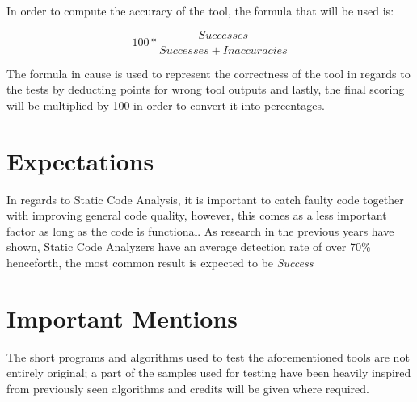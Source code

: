 
\begin{center}
    \noindent In order to compute the accuracy of the tool, the formula that will be used is:
\end{center}

\begin{equation}
100 * \frac{Successes}{Successes + Inaccuracies}    
\end{equation}\newline

\noindent The formula in cause is used to represent the correctness of the tool in regards to the tests by deducting points for wrong tool outputs and lastly, the final scoring will be multiplied by 100 in order to convert it into percentages.

\section{Expectations}

In regards to Static Code Analysis, it is important to catch faulty code together with improving general code quality, however, this comes as a less important factor as long as the code is functional. As research \cite{cuoq2012benchmarking} \cite{herter2019benchmarking} in the previous years have shown, Static Code Analyzers have an average detection rate of over 70\% henceforth, the most common result is expected to be \textit{Success} 

\section{Important Mentions}\label{githubRef}

The short programs and algorithms used to test the aforementioned tools are not entirely original; a part of the samples used for testing have been heavily inspired from previously seen algorithms and credits will be given where required. %


